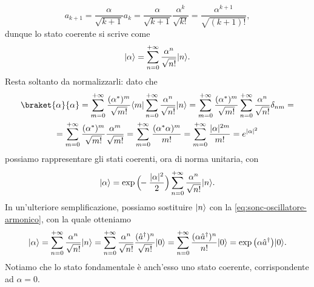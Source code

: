 \begin{equation}
	a_{k+1}=\frac{\alpha}{\sqrt{k+1}}a_k=\frac{\alpha}{\sqrt{k+1}}\frac{\alpha^k}{\sqrt{k!}}=\frac{\alpha^{k+1}}{\sqrt{(k+1)!}},
\end{equation}
dunque lo stato coerente si scrive come
\begin{equation}
	\lvert\alpha\rangle=\sum_{n=0}^{+\infty}\frac{\alpha^n}{\sqrt{n!}}\lvert n\rangle.
\end{equation}
Resta soltanto da normalizzarli: dato che
\begin{multline}
	\braket{\alpha}{\alpha}=\sum_{m=0}^{+\infty}\frac{(\alpha^*)^m}{\sqrt{m!}}\bra{m}\sum_{n=0}^{+\infty}\frac{\alpha^n}{\sqrt{n!}}\ket{n}=
	\sum_{m=0}^{+\infty}\frac{(\alpha^*)^m}{\sqrt{m!}}\sum_{n=0}^{+\infty}\frac{\alpha^n}{\sqrt{n!}}\delta_{nm}=\\=
	\sum_{m=0}^{+\infty}\frac{(\alpha^*)^m}{\sqrt{m!}}\frac{\alpha^m}{\sqrt{m!}}=
	\sum_{m=0}^{+\infty}\frac{(\alpha^*\alpha)^m}{m!}=
	\sum_{m=0}^{+\infty}\frac{\abs{\alpha}^{2m}}{m!}=
	e^{\abs{\alpha}^2}
	\label{eq:norma-stato-coerente}
\end{multline}
possiamo rappresentare gli stati coerenti, ora di norma unitaria, con
\begin{equation}
	\lvert\alpha\rangle=\exp\Big(\!\!-\frac{\lvert\alpha\rvert^2}2\Big)\sum_{n=0}^{+\infty}\frac{\alpha^n}{\sqrt{n!}}\lvert n\rangle.
	\label{eq:stato-coerente-normalizzato}
\end{equation}
In un'ulteriore semplificazione, possiamo sostituire $\lvert n\rangle$ con la \eqref{eq:sonc-oscillatore-armonico}, con la quale otteniamo
\begin{equation}
	\lvert\alpha\rangle=\sum_{n=0}^{+\infty}\frac{\alpha^n}{\sqrt{n!}}\lvert n\rangle=\sum_{n=0}^{+\infty}\frac{\alpha^n}{\sqrt{n!}}\frac{(\hat{a}^\dagger)^n}{\sqrt{n!}}\lvert0\rangle=\sum_{n=0}^{+\infty}\frac{(\alpha\hat{a}^\dagger)^n}{n!}\lvert0\rangle=\exp\big(\alpha\hat{a}^\dagger\big)\lvert0\rangle.
	\label{eq:stato-coerente-exp}
\end{equation}
Notiamo che lo stato fondamentale è anch'esso uno stato coerente, corrispondente ad $\alpha=0$.

